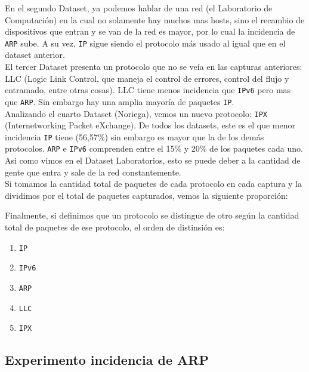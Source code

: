 En el segundo Dataset, ya podemos hablar de una red (el Laboratorio de Computación) en la cual no solamente hay muchos mas hosts, sino el recambio de dispositivos que entran y se van de la red es mayor, por lo cual la incidencia de \texttt{ARP} sube. A su vez, \texttt{IP} sigue siendo el protocolo más usado al igual que en el dataset anterior. \\

El tercer Dataset presenta un protocolo que no se veía en las capturas anteriores: LLC (Logic Link Control, que maneja el control de errores, control del flujo y entramado, entre otras cosas). LLC tiene menos incidencia que \texttt{IPv6} pero mas que \texttt{ARP}. Sin embargo hay una amplia mayoría de paquetes \texttt{IP}. \\

Analizando el cuarto Dataset (Noriega), vemos un nuevo protocolo: \texttt{IPX} (Internetworking Packet eXchange). De todos los datasets, este es el que menor incidencia \texttt{IP} tiene (56,57\%) sin embargo es mayor que la de los demás protocolos. \texttt{ARP} e \texttt{IPv6} comprenden entre el 15\% y 20\% de los paquetes cada uno. Asi como vimos en el Dataset Laboratorios, esto se puede deber a la cantidad de gente que entra y sale de la red constantemente. \\

Si tomamos la cantidad total de paquetes de cada protocolo en cada captura y la dividimos por el total de paquetes capturados, vemos la siguiente proporción: \\


Finalmente, si definimos que un protocolo se distingue de otro según la cantidad total de paquetes de ese protocolo, el orden de distinsión es:

\begin{enumerate}
\item \texttt{IP}
\item \texttt{IPv6}
\item \texttt{ARP}
\item \texttt{LLC}
\item \texttt{IPX}
\end{enumerate}


\subsection{Experimento incidencia de ARP}

